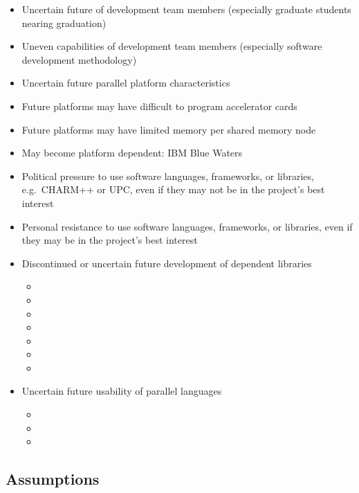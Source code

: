 \documentclass{article}
\begin{document}
    \begin{itemize} 
%
    \item Uncertain future of development team members (especially
    graduate students nearing graduation)
%
    \item Uneven capabilities of development team members (especially
    software development methodology)
%
    \item Uncertain future parallel platform characteristics
%
    \item Future platforms may have difficult to program accelerator cards
%
    \item Future platforms may have limited memory per shared memory node
%
    \item May become platform dependent: IBM Blue Waters
%
    \item Political pressure to use software languages, frameworks, or libraries, e.g.~CHARM++ or UPC, even if they may not be in the project's best interest
%
    \item Personal resistance to use software languages, frameworks, or libraries, even if they may be in the project's best interest
%
    \item Discontinued or uncertain future development of dependent libraries
%
    \begin{itemize}
        \item {}
        \item {}
        \item {}
        \item {}
        \item {}
        \item {}
        \item {}
    \end{itemize}
%
    \item Uncertain future usability of parallel languages
%
    \begin{itemize}
        \item {}
        \item {}
        \item {}
    \end{itemize}
%
\end{itemize}

   


\subsection{Assumptions}
\end{document}
